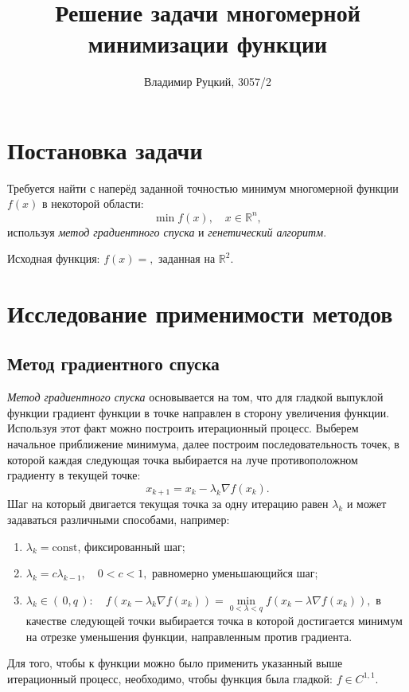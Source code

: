 \documentclass[10pt,a4paper,titlepage]{article}
\title{Решение задачи многомерной минимизации функции}
\author{Владимир Руцкий, 3057/2}
\newcommand\RR{\mathbb{R}}
\begin{document}
\maketitle
\thispagestyle{empty}

\section{Постановка задачи}
Требуется найти с наперёд заданной точностью минимум многомерной функции $f(x)$ в некоторой области:
$$ \min f(x), \quad x \in \RR^n, $$
используя \textit{метод градиентного спуска} и \textit{генетический алгоритм}.

Исходная функция: $f(x) = ,$ заданная на $\RR^2$. %

\section{Исследование применимости методов}
\subsection{Метод градиентного спуска}
\label{GradientDescentMethodConditions}
\textit{Метод градиентного спуска} основывается на том, что для гладкой выпуклой функции градиент функции в точке направлен
в сторону увеличения функции.
Используя этот факт можно построить итерационный процесс. 
Выберем начальное приближение минимума, далее построим последовательность точек,
в которой каждая следующая точка выбирается на луче противоположном градиенту в текущей точке:
$$ x_{k+1} = x_k - \lambda_k \nabla f(x_k). $$
Шаг на который двигается текущая точка за одну итерацию равен $\lambda_k$ и может задаваться различными способами, например:
\begin{enumerate}
  \item $\lambda_k = \mathrm{const}$, фиксированный шаг;
  \item $\lambda_k = c \lambda_{k-1}, \quad 0 < c < 1,$ равномерно уменьшающийся шаг;
  \item $\lambda_k \in (\,0, q\,)\!: 
    \quad f(x_k - \lambda_k \nabla f(x_k)) = \min\limits_{0 < \lambda < q} f(x_k - \lambda \nabla f(x_k)),$
    в качестве следующей точки выбирается точка в которой достигается минимум на отрезке уменьшения функции,
    направленным против градиента.
\end{enumerate}

Для того, чтобы к функции можно было применить указанный выше итерационный процесс, необходимо, 
чтобы функция была гладкой: $f \in C^{1,1}$.
\end{document}
